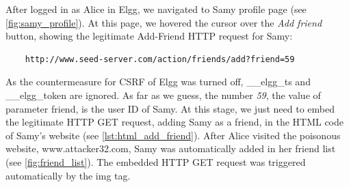 After logged in as Alice in Elgg, we navigated to Samy profile page (see \autoref{fig:samy_profile}).
At this page, we hovered the cursor over the \emph{Add friend} button, showing the
legitimate Add-Friend HTTP request for Samy:

\begin{verbatim}
    http://www.seed-server.com/action/friends/add?friend=59
\end{verbatim}

As the countermeasure for CSRF
of Elgg was turned off, {\selectfont \_\_elgg\_ts} and {\selectfont
\_\_elgg\_token} are ignored. As far as we guess, the number \emph{59}, the value of parameter
{\selectfont friend}, is the user ID of Samy. At this stage, we just need
to embed the legitimate HTTP GET request, adding Samy as a friend, in the HTML code of Samy's
website (see \autoref{lst:html_add_friend}). After Alice visited the poisonous website,
{\selectfont www.attacker32.com}, Samy was automatically added in her friend
list (see \autoref{fig:friend_list}). The embedded HTTP GET request was triggered automatically
by the {\selectfont img} tag.